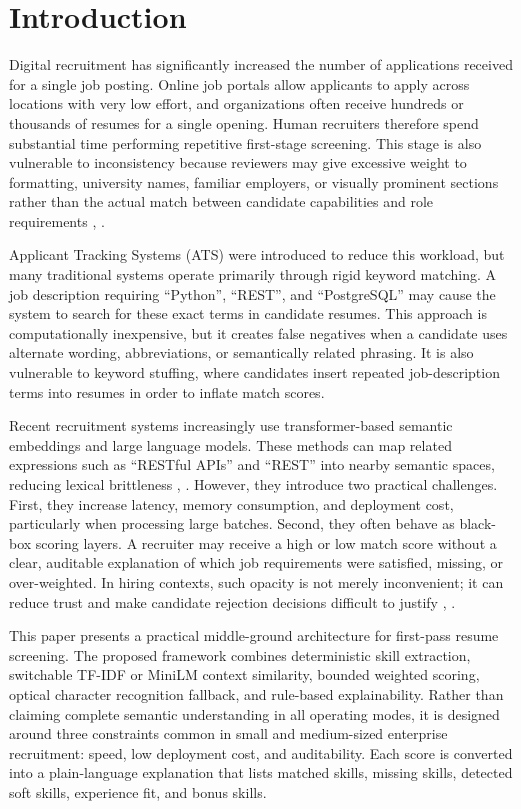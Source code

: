 \section{Introduction}
Digital recruitment has significantly increased the number of applications received for a single job posting. Online job portals allow applicants to apply across locations with very low effort, and organizations often receive hundreds or thousands of resumes for a single opening. Human recruiters therefore spend substantial time performing repetitive first-stage screening. This stage is also vulnerable to inconsistency because reviewers may give excessive weight to formatting, university names, familiar employers, or visually prominent sections rather than the actual match between candidate capabilities and role requirements \cite{b3}, \cite{b10}.

Applicant Tracking Systems (ATS) were introduced to reduce this workload, but many traditional systems operate primarily through rigid keyword matching. A job description requiring ``Python'', ``REST'', and ``PostgreSQL'' may cause the system to search for these exact terms in candidate resumes. This approach is computationally inexpensive, but it creates false negatives when a candidate uses alternate wording, abbreviations, or semantically related phrasing. It is also vulnerable to keyword stuffing, where candidates insert repeated job-description terms into resumes in order to inflate match scores.

Recent recruitment systems increasingly use transformer-based semantic embeddings and large language models. These methods can map related expressions such as ``RESTful APIs'' and ``REST'' into nearby semantic spaces, reducing lexical brittleness \cite{b6}, \cite{b12}. However, they introduce two practical challenges. First, they increase latency, memory consumption, and deployment cost, particularly when processing large batches. Second, they often behave as black-box scoring layers. A recruiter may receive a high or low match score without a clear, auditable explanation of which job requirements were satisfied, missing, or over-weighted. In hiring contexts, such opacity is not merely inconvenient; it can reduce trust and make candidate rejection decisions difficult to justify \cite{b8}, \cite{b14}.

This paper presents a practical middle-ground architecture for first-pass resume screening. The proposed framework combines deterministic skill extraction, switchable TF-IDF or MiniLM context similarity, bounded weighted scoring, optical character recognition fallback, and rule-based explainability. Rather than claiming complete semantic understanding in all operating modes, it is designed around three constraints common in small and medium-sized enterprise recruitment: speed, low deployment cost, and auditability. Each score is converted into a plain-language explanation that lists matched skills, missing skills, detected soft skills, experience fit, and bonus skills.

